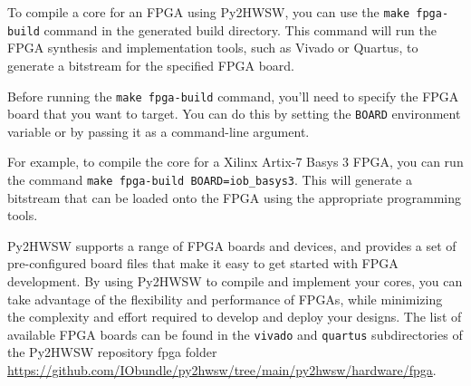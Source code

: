 %

To compile a core for an FPGA using Py2HWSW, you can use the \texttt{make fpga-build} command in the generated build directory.
This command will run the FPGA synthesis and implementation tools, such as Vivado or Quartus, to generate a bitstream for the specified FPGA board.

Before running the \texttt{make fpga-build} command, you'll need to specify the FPGA board that you want to target. You can do this by setting the \texttt{BOARD} environment variable or by passing it as a command-line argument.

For example, to compile the core for a Xilinx Artix-7 Basys 3 FPGA, you can run the command \texttt{make fpga-build BOARD=iob\_basys3}. This will generate a bitstream that can be loaded onto the FPGA using the appropriate programming tools.

Py2HWSW supports a range of FPGA boards and devices, and provides a set of pre-configured board files that make it easy to get started with FPGA development. By using Py2HWSW to compile and implement your cores, you can take advantage of the flexibility and performance of FPGAs, while minimizing the complexity and effort required to develop and deploy your designs.
The list of available FPGA boards can be found in the \texttt{vivado} and \texttt{quartus} subdirectories of the Py2HWSW repository fpga folder \url{https://github.com/IObundle/py2hwsw/tree/main/py2hwsw/hardware/fpga}.
